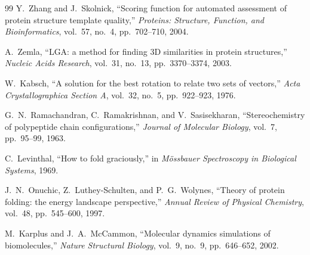 \documentclass[12pt,a4paper]{article}
\theoremstyle{remark}
\begin{document}
\begin{thebibliography}{99}
Y.~Zhang and J.~Skolnick,
``Scoring function for automated assessment of protein structure template quality,''
\textit{Proteins: Structure, Function, and Bioinformatics}, vol.~57, no.~4, pp.~702--710, 2004.

A.~Zemla,
``LGA: a method for finding 3D similarities in protein structures,''
\textit{Nucleic Acids Research}, vol.~31, no.~13, pp.~3370--3374, 2003.

W.~Kabsch,
``A solution for the best rotation to relate two sets of vectors,''
\textit{Acta Crystallographica Section A}, vol.~32, no.~5, pp.~922--923, 1976.

G.~N.~Ramachandran, C.~Ramakrishnan, and V.~Sasisekharan,
``Stereochemistry of polypeptide chain configurations,''
\textit{Journal of Molecular Biology}, vol.~7, pp.~95--99, 1963.

C.~Levinthal,
``How to fold graciously,''
in \textit{M\"ossbauer Spectroscopy in Biological Systems}, 1969.

J.~N.~Onuchic, Z.~Luthey-Schulten, and P.~G.~Wolynes,
``Theory of protein folding: the energy landscape perspective,''
\textit{Annual Review of Physical Chemistry}, vol.~48, pp.~545--600, 1997.

M.~Karplus and J.~A.~McCammon,
``Molecular dynamics simulations of biomolecules,''
\textit{Nature Structural Biology}, vol.~9, no.~9, pp.~646--652, 2002.

\end{thebibliography}
\end{document}
